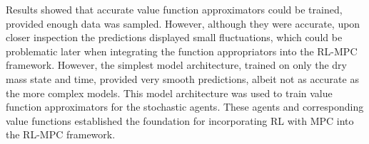  Results showed that accurate value function approximators could be trained, provided enough data was sampled. However, although they were accurate, upon closer inspection the predictions displayed small fluctuations, which could be problematic later when integrating the function appropriators into the RL-MPC framework. However, the simplest model architecture, trained on only the dry mass state and time, provided very smooth predictions, albeit not as accurate as the more complex models. This model architecture was used to train value function approximators for the stochastic agents. These agents and corresponding value functions established the foundation for incorporating RL with MPC into the RL-MPC framework.

